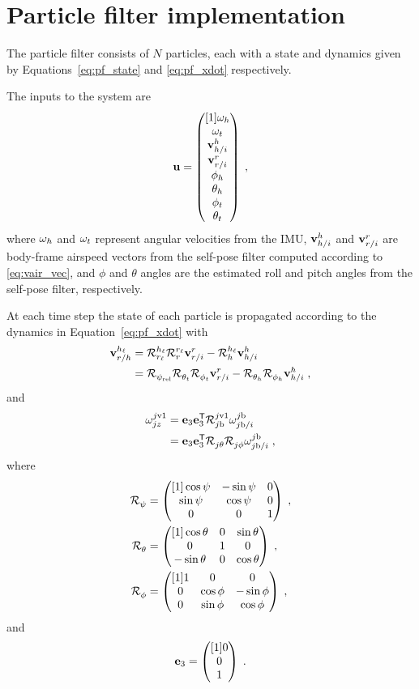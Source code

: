 \section{Particle filter implementation}
The particle filter consists of $N$ particles, each with a state and dynamics given by Equations~\eqref{eq:pf_state} and \eqref{eq:pf_xdot} respectively.

The inputs to the system are
\begin{equation}
    {\mathbf{u}} = \begin{pmatrix}[1] {\mathbf{\omega}}_h \\ {\mathbf{\omega}}_t \\ {\mathbf{v}}_{h/i}^{h} \\ {\mathbf{v}}_{r/i}^{r} \\ \phi_h \\ \theta_h \\ \phi_t \\ \theta_t \end{pmatrix} \;,
\end{equation}
where ${\mathbf{\omega}}_h$ and ${\mathbf{\omega}}_t$ represent angular velocities from the IMU, ${\mathbf{v}}_{h/i}^{h}$ and ${\mathbf{v}}_{r/i}^{r}$ are body-frame airspeed vectors from the self-pose filter computed according to \eqref{eq:vair_vec}, and $\phi$ and $\theta$ angles are the estimated roll and pitch angles from the self-pose filter, respectively.

At each time step the state of each particle is propagated according to the dynamics in Equation~\eqref{eq:pf_xdot} with
\begin{align}
    {\mathbf{v}}_{r/h}^{h_\ell} &={\mathcal{R}}_{{r_\ell}}^{{h_\ell}}{\mathcal{R}}_{{r}}^{{r_\ell}}{\mathbf{v}}_{r/i}^{{r}} -
       {\mathcal{R}}_{{h}}^{{h_\ell}}{\mathbf{v}}_{h/i}^{{h}} \\
       &= {\mathcal{R}}_{{{\psi}_\text{rel}}}^{}{\mathcal{R}}_{\theta_t}^{}{\mathcal{R}}_{\phi_t}^{}{\mathbf{v}}_{r/i}^{{r}} -
       {\mathcal{R}}_{\theta_h}^{}{\mathcal{R}}_{\phi_h}^{}{\mathbf{v}}_{h/i}^{{h}}\;,
\end{align}
and
\begin{align}
    {\mathbf{\omega}}_{jz}^{j\text{v1}} &=
    \mathbf{e}_3\mathbf{e}_3^{\mathsf{T}}{\mathcal{R}}_{j\text{b}}^{j\text{v1}}{\mathbf{\omega}}_{j\text{b}/i}^{j\text{b}} \\
    &= \mathbf{e}_3\mathbf{e}_3^{\mathsf{T}}{\mathcal{R}}_{j\theta}^{}{\mathcal{R}}_{j\phi}^{}{\mathbf{\omega}}_{j\text{b}/i}^{j\text{b}}\;,
\end{align}
where
\begin{align}
        \label{eq:R_psi}
    {\mathcal{R}}_{\psi}^{} &= \begin{pmatrix}[1] 
        \cos\psi & -\sin\psi & 0 \\
        \sin\psi & \cos\psi & 0 \\
        0 & 0 & 1
     \end{pmatrix}\;, \\
        \label{eq:R_theta}
    {\mathcal{R}}_{\theta}^{} &= \begin{pmatrix}[1] 
        \cos\theta & 0 & \sin\theta \\
        0 & 1 & 0 \\
        -\sin\theta & 0 & \cos\theta
     \end{pmatrix}\;, \\
        \label{eq:R_phi}
    {\mathcal{R}}_{\phi}^{} &= \begin{pmatrix}[1] 
        1 & 0 & 0 \\
        0 & \cos\phi & -\sin\phi \\
        0 & \sin\phi & \cos\phi
     \end{pmatrix}\;,
\end{align}
and
\begin{equation}
    \mathbf{e}_3 = \begin{pmatrix}[1] 0 \\ 0\\ 1 \end{pmatrix}\;.
\end{equation}

